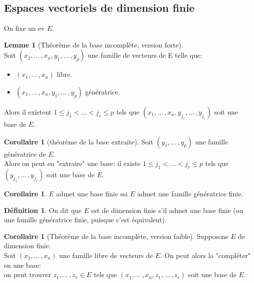 \documentclass[10pt,a4paper]{article}
\theoremstyle{definition}
\newtheorem{corollaire}[proposition]{Corollaire}
\newtheorem{lemme}[proposition]{Lemme}
\newtheorem{definition}[proposition]{Définition}
\begin{document}
\subsection{Espaces vectoriels de dimension finie}
On fixe un ev $E$.
\begin{lemme}[Théorème de la base incomplète, version forte]
\hfill \\
Soit $(x_1, ...\, , x_n, y_1, ...\, , y_p)$ une famille de vecteurs de E telle que:
\begin{itemize}
\item $(x_1, ...\, , x_n)$ libre.
\item $(x_1, ...\, , x_n, y_1, ...\, , y_p)$ génératrice.
\end{itemize}
Alors il existent $1 \leq j_1 < ... < j_r \leq p$ tels que $(x_1, ...\, , x_n, y_{j_1}, ...\, , y_{j_r})$ soit une base de $E$.
\end{lemme}
\begin{corollaire}[théorème de la base extraite]
Soit $(y_1, ...\, , y_p)$ une famille génératrice de $E$. \\
Alors on peut en "extraire" une base: il existe $1 \leq j_1 < ... < j_r \leq p$ tels que $(y_{j_1}, ...\, , y_{j_r})$ soit une base de $E$.
\end{corollaire}
\begin{corollaire}
$E$ admet une base finie ssi $E$ admet une famille génératrice finie.
\end{corollaire}
\begin{definition}
On dit que $E$ est de dimension finie s'il admet une base finie (ou une famille génératrice finie, puisque c'est équivalent).
\end{definition}
\begin{corollaire}[Théorème de la base incomplète, version faible]
Supposons $E$ de dimension finie. \\
Soit $(x_1, ...\, , x_n)$ une famille libre de vecteurs de $E$. On peut alors la "compléter" en une base: \\
on peut trouver $z_1, ...\, , z_r \in E$ tels que $(x_1, ...\, , x_n, z_1, ...\, , z_r)$ soit une base de $E$.
\end{corollaire}
\end{document}
